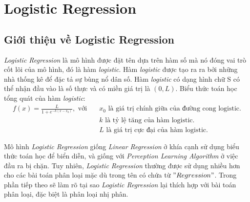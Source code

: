 \chapter{Logistic Regression}
\label{chp:02}

\section{Giới thiệu về Logistic Regression}
\textit{Logistic Regression} là mô hình được đặt tên dựa trên hàm số mà nó đóng vai trò cốt lõi của mô hình, đó là hàm \textit{logistic}. Hàm \textit{logistic} được tạo ra ra bởi những nhà thống kê để đặc tả sự bùng nổ dân số. Hàm \textit{logistic} có dạng hình chữ S có thể nhận đầu vào là số thực và có miền giá trị là $(0, L)$. Biểu thức toán học tổng quát của hàm \textit{logistic}:
\begin{align*}
f(x)=\frac{L}{1 + e^{-k(x-x_{0})}}, \text{ với} \quad &x_{0} \text{ là giá trị chính giữa của đường cong logistic.}\\
     &k \text{ là tỷ lệ tăng của hàm logistic.}\\
    &L \text{ là giá trị cực đại của hàm logistic.}
\end{align*}

Mô hình \textit{Logistic Regression} giống \textit{Linear Regression} ở khía cạnh sử dụng biểu thức toán học để biển diễn, và giống với \textit{Perception Learning Algorithm} ở việc đầu ra bị chặn. Tuy nhiên, \textit{Logistic Regression} thường được sử dụng nhiều hơn cho các bài toán phân loại mặc dù trong tên có chứa từ $"Regression"$. Trong phần tiếp theo sẽ làm rõ tại sao \textit{Logistic Regression} lại thích hợp với bài toán phân loại, đặc biệt là phân loại nhị phân.

